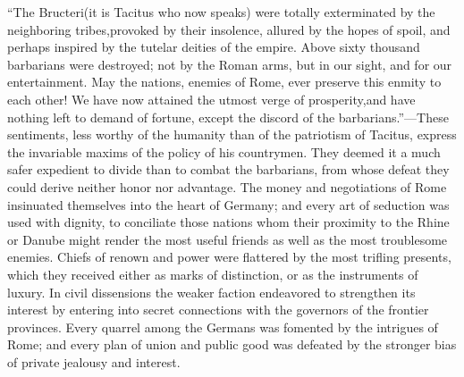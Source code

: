 “The Bructeri\footnotemark[771] (it is Tacitus who now speaks) were totally
exterminated by the neighboring tribes,\footnotemark[78] provoked by their
insolence, allured by the hopes of spoil, and perhaps inspired by
the tutelar deities of the empire. Above sixty thousand
barbarians were destroyed; not by the Roman arms, but in our
sight, and for our entertainment. May the nations, enemies of
Rome, ever preserve this enmity to each other! We have now
attained the utmost verge of prosperity,\footnotemark[79] and have nothing left
to demand of fortune, except the discord of the barbarians.”\footnotemark[80]
—These sentiments, less worthy of the humanity than of the
patriotism of Tacitus, express the invariable maxims of the
policy of his countrymen. They deemed it a much safer expedient
to divide than to combat the barbarians, from whose defeat they
could derive neither honor nor advantage. The money and
negotiations of Rome insinuated themselves into the heart of
Germany; and every art of seduction was used with dignity, to
conciliate those nations whom their proximity to the Rhine or
Danube might render the most useful friends as well as the most
troublesome enemies. Chiefs of renown and power were flattered by
the most trifling presents, which they received either as marks
of distinction, or as the instruments of luxury. In civil
dissensions the weaker faction endeavored to strengthen its
interest by entering into secret connections with the governors
of the frontier provinces. Every quarrel among the Germans was
fomented by the intrigues of Rome; and every plan of union and
public good was defeated by the stronger bias of private jealousy
and interest.\footnotemark[81]





